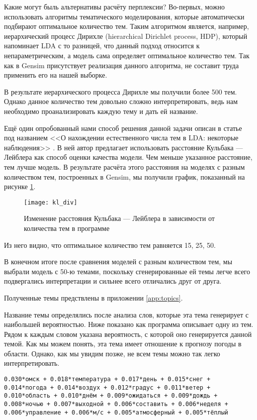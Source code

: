 Какие могут быль альтернативы расчёту перплексии? Во-первых, можно использовать алгоритмы тематического моделирования, которые автоматически подбирают оптимальное количество тем. Таким алгоритмом является, например, иерархический процесс Дирихле (hierarchical Dirichlet process, HDP), который напоминает LDA с то разницей, что данный подход относится к непараметрическим, а модель сама определяет оптимальное количество тем. Так как в Gensim присутствует реализация данного алгоритма, не составит труда применить его на нашей выборке.

В результате иерархического процесса Дирихле мы получили более 500 тем. Однако данное количество тем довольно сложно  интерпретировать, ведь нам необходимо проанализировать каждую тему и дать ей название.

Ещё один опробованный нами способ решения данной задачи описан в статье под названием <<О нахождении естественного числа тем в LDA: некоторые наблюдения>> \cite{Arun_KL}. В ней автор предлагает использовать  расстояние Кульбака — Лейблера как способ оценки качества модели. Чем меньше указанное расстояние, тем лучше модель. В результате расчёта этого расстояния на моделях с разным количеством тем, построенных в Gensim, мы получили график, показанный на рисунке \ref{fig:kl_div}.

\begin{figure}
	\centering
    \texttt{[image: kl\_div]}
    \caption{Изменение расстояния Кульбака — Лейблера в зависимости от количества тем в программе}
    \label{fig:kl_div}
\end{figure}

Из него видно, что оптимальное количество тем равняется 15, 25, 50.

В конечном итоге после сравнения моделей с разным количеством тем, мы выбрали модель с 50-ю темами, поскольку сгенерированные ей темы легче всего подвергались интерпретации и сильнее всего отличались друг от друга.

Полученные темы предствлены в приложении \ref{app:topics}.

Название темы определялись после анализа слов, которые эта тема генерирует с наибольшей вероятностью. Ниже показано как программа описывает одну из тем. Рядом к каждым словом указана вероятность, с которой оно генерируется данной темой. Как мы можем понять, эта тема имеет отношение к прогнозу погоды в области. Однако, как мы увидим позже, не всем темы можно так легко интерпретировать.

\texttt{0.030*омск + 0.018*температура + 0.017*день + 0.015*снег + 0.014*погода + 0.014*воздух + 0.012*градус + 0.011*ветер + 0.010*область + 0.010*днём + 0.009*ожидаться + 0.009*дождь + 0.008*ночью + 0.007*выходной + 0.006*составить + 0.006*неделя + 0.006*управление + 0.006*м/с + 0.005*атмосферный + 0.005*тёплый}

